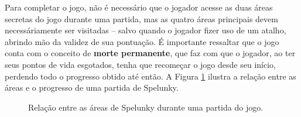 Para completar o jogo, não é necessário que o jogador acesse as duas áreas
secretas do jogo durante uma partida, mas as quatro áreas principais devem
necessáriamente ser visitadas -- salvo quando o jogador fizer uso de um atalho,
abrindo mão da validez de sua pontuação. É importante ressaltar que o jogo conta
com o conceito de \textbf{morte permanente}, que faz com que o jogador, ao ter
seus pontos de vida esgotados, tenha que recomeçar o jogo desde seu início,
perdendo todo o progresso obtido até então.  A Figura \ref{fig:spelunky-run}
ilustra a relação entre as áreas e o progresso de uma partida de Spelunky.

\begin{figure}[htb!]
\centering
{}
\caption{\label{fig:spelunky-run}Relação entre as áreas de Spelunky durante uma
partida do jogo.}
\end{figure}

